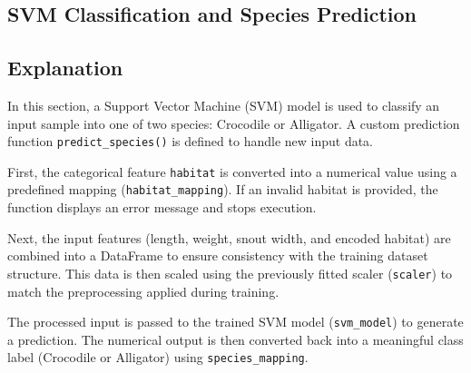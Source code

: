 \documentclass[11pt,a4paper]{report}
\begin{document}
\subsection{SVM Classification and Species Prediction}
\subsection*{Explanation}

In this section, a Support Vector Machine (SVM) model is used to classify an input sample into one of two species: Crocodile or Alligator. A custom prediction function \texttt{predict\_species()} is defined to handle new input data.

First, the categorical feature \texttt{habitat} is converted into a numerical value using a predefined mapping (\texttt{habitat\_mapping}). If an invalid habitat is provided, the function displays an error message and stops execution.

Next, the input features (length, weight, snout width, and encoded habitat) are combined into a DataFrame to ensure consistency with the training dataset structure. This data is then scaled using the previously fitted scaler (\texttt{scaler}) to match the preprocessing applied during training.

The processed input is passed to the trained SVM model (\texttt{svm\_model}) to generate a prediction. The numerical output is then converted back into a meaningful class label (Crocodile or Alligator) using \texttt{species\_mapping}.
\end{document}
